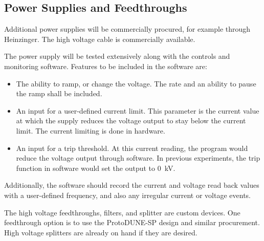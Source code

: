 \subsection{Power Supplies and Feedthroughs}
\label{sec:fdsp-hv-supplies-feedthroughs}

Additional power supplies will be commercially procured, for example through Heinzinger. The high voltage cable is commercially available.

The power supply will be tested extensively along with the controls and monitoring software.  Features to be included in the software are:
\begin{itemize}
\item The ability to ramp, or change the voltage.  The rate and an ability to pause the ramp shall be included.
\item An input for a user-defined current limit.  This parameter is the current value at which the supply reduces the voltage output to stay below the current limit.  The current limiting is done in hardware.
\item An input for a trip threshold.  At this current reading, the program would reduce the voltage output through software.  In previous experiments, the trip function in software would set the output to \SI{0}{kV}.
\end{itemize}
\noindent Additionally, the software should record the current and voltage read back values with a user-defined frequency, and also any irregular current or voltage events.

The high voltage feedthroughs, filters, and splitter are custom devices.  One feedthrough option is to use the ProtoDUNE-SP design and similar procurement.  High voltage splitters are already on hand if they are desired.

\subsection{}
\label{sec:fdsp-hv-prod-cpa}

